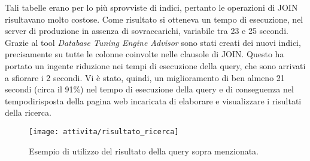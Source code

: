 Tali tabelle erano per lo più sprovviste di indici, pertanto le operazioni di JOIN risultavano molto costose. Come risultato si otteneva un tempo di esecuzione, nel server di produzione in assenza di sovraccarichi, variabile tra 23 e 25 secondi. Grazie al tool \textit{Database Tuning Engine Advisor} sono stati creati dei nuovi indici, precisamente su tutte le colonne coinvolte nelle clausole di JOIN. Questo ha portato un ingente riduzione nei tempi di esecuzione della query, che sono arrivati a sfiorare i 2 secondi. Vi è stato, quindi, un miglioramento di ben almeno 21 secondi (circa il 91\%) nel tempo di esecuzione della query e di conseguenza nel \gls{tempodirisposta} della pagina web incaricata di elaborare e visualizzare i risultati della ricerca.\\
\begin{figure}[!h] 
	\centering 
	\texttt{[image: attivita/risultato\_ricerca]} 
	\caption{Esempio di utilizzo del risultato della query sopra menzionata.}
\end{figure}

